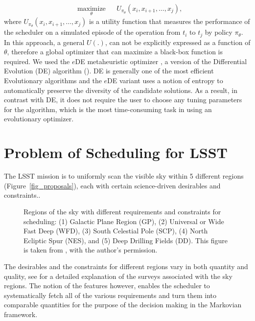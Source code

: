 \documentclass[12pt]{aastex62}
\theoremstyle{definition}
\begin{document}
\begin{equation}%
\begin{aligned}
& \underset{\theta}{\text{maximize}}
& & U_{\pi_{\theta}}(x_i,x_{i+1}, \dots, x_{j}),
\end{aligned}
\end{equation}
where $U_{\pi_{\theta}}(x_i,x_{i+1}, \dots, x_{j})$ is a utility function that measures the performance of the scheduler on a simulated episode of the operation from $t_i$ to $t_j$ by policy $\pi_{\theta}$. In this approach, a general $U(.)$, can not be explicitly expressed as a function of $\theta$, therefore a global optimizer that can maximize a black-box function is required. We used the $e$DE metaheuristic optimizer \citep{naghib2016entropic}, a version of the Differential Evolution (DE) algorithm (\citep{storn1997differential}). DE is generally one of the most efficient Evolutionary algorithms and the $e$DE variant uses a notion of entropy to automatically preserve the diversity of the candidate solutions. As a result, in contrast with DE, it does not require the user to choose any tuning parameters for the algorithm, which is the most time-consuming task in using an evolutionary optimizer.


\section{Problem of Scheduling for LSST}\label{sec_lsst_problem}

The LSST mission is to uniformly scan the visible sky within 5 different regions (Figure~\ref{fig_proposals}), each with certain science-driven desirables and constraints..

\begin{figure}[h!]
\begin{center}
\caption{Regions of the sky with different requirements and constraints for scheduling: (1) Galactic Plane Region (GP), (2) Universal or Wide Fast Deep (WFD), (3) South Celestial Pole (SCP), (4) North Ecliptic Spur (NES), and (5) Deep Drilling Fields (DD). This figure is taken from \citep{jones2017large}, with the author's permission.}
\end{center}
\end{figure}\label{fig_proposals}

The desirables and the constraints for different regions vary in both quantity and quality, see \citep{ivezic2008lsst} for a detailed explanation of the surveys associated with the sky regions. The notion of the features however, enables the scheduler to systematically fetch all of the various requirements and turn them into comparable quantities for the purpose of the decision making in the Markovian framework.
\end{document}
